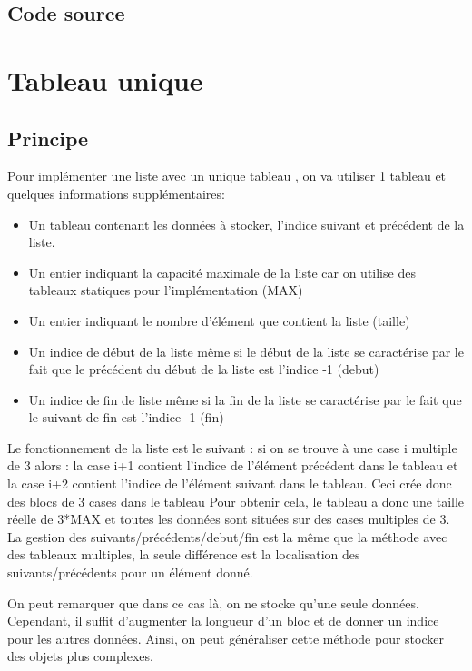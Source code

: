 \documentclass{report}
\begin{document}
      \subsection{Code source}
        
        
    \section{Tableau unique}
      \subsection{Principe}
        Pour implémenter une liste avec un unique tableau , on va utiliser 1 tableau et quelques informations supplémentaires: 
        \begin{itemize}
          \item Un tableau contenant les données à stocker, l'indice suivant et précédent de la liste.
          \item Un entier indiquant la capacité maximale de la liste car on utilise des tableaux statiques pour l'implémentation (MAX)
          \item Un entier indiquant le nombre d'élément que contient la liste (taille)
          \item Un indice de début de la liste même si le début de la liste se caractérise par le fait que le précédent du début de la liste est l'indice -1 (debut)
          \item Un indice de fin de liste même si la fin de la liste se caractérise par le fait que le suivant de fin est l'indice -1 (fin)
        \end{itemize}
        Le fonctionnement de la liste est le suivant : si on se trouve à une case i multiple de 3 alors : la case i+1 contient l'indice de l'élément précédent dans le tableau et la case i+2 contient l'indice de l'élément suivant dans le tableau. Ceci crée donc des blocs de 3 cases dans le tableau
        Pour obtenir cela, le tableau a donc une taille réelle de 3*MAX et toutes les données sont situées sur des cases multiples de 3.
        La gestion des suivants/précédents/debut/fin est la même que la méthode avec des tableaux multiples, la seule différence est la localisation des suivants/précédents pour un élément donné.
        
        On peut remarquer que dans ce cas là, on ne stocke qu'une seule données. Cependant, il suffit d'augmenter la longueur d'un bloc et de donner un indice pour les autres données. Ainsi, on peut généraliser cette méthode pour stocker des objets plus complexes.
        
\end{document}
